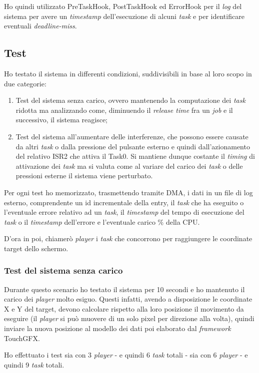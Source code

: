 \documentclass{article}
\begin{document}
Ho quindi utilizzato PreTaskHook, PostTaskHook ed ErrorHook per il \textit{log} del sistema per avere un \textit{\textit{timestamp}} dell'esecuzione di alcuni \textit{task} e per identificare eventuali \textit{deadline-miss}.

\subsection{Test}
Ho testato il sistema in differenti condizioni, suddivisibili in base al loro scopo in due categorie:
\begin{enumerate}
	\item Test del sistema senza carico, ovvero mantenendo la computazione dei \textit{task} ridotta ma analizzando come, diminuendo il \textit{release time} fra un \textit{job} e il successivo, il sistema reagisce;
	\item Test del sistema all'aumentare delle interferenze, che possono essere causate da altri \textit{task} o dalla pressione del pulsante esterno e quindi dall'azionamento del relativo ISR2 che attiva il Task0. Si mantiene dunque costante il \textit{timing} di attivazione dei \textit{task} ma si valuta come al variare del carico dei \textit{task} o delle pressioni esterne il sistema viene perturbato.
\end{enumerate}
Per ogni test ho memorizzato, trasmettendo tramite DMA, i dati in un file di log esterno, comprendente un id incrementale della entry, il \textit{task} che ha eseguito o l'eventuale errore relativo ad un \textit{task}, il \textit{timestamp} del tempo di esecuzione del \textit{task} o il \textit{timestamp} dell'errore e l'eventuale carico \% della CPU.

D'ora in poi, chiamerò \textit{player} i \textit{task} che concorrono per raggiungere le coordinate target dello schermo.
\subsubsection{Test del sistema senza carico}
Durante questo scenario ho testato il sistema per 10 secondi e ho mantenuto il carico dei \textit{player} molto esiguo. Questi infatti, avendo a disposizione le coordinate X e Y del target, devono calcolare rispetto alla loro posizione il movimento da eseguire (il \textit{player} si può muovere di un solo pixel per direzione alla volta), quindi inviare la nuova posizione al modello dei dati poi elaborato dal \textit{framework} TouchGFX.

Ho effettuato i test sia con 3 \textit{player} - e quindi 6 \textit{task} totali - sia con 6 \textit{player} - e quindi 9 \textit{task} totali. 
\end{document}
